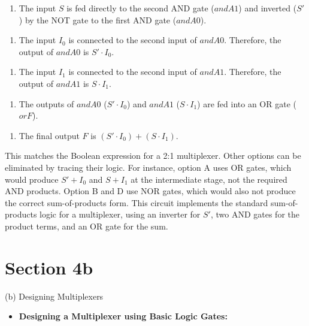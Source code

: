 \documentclass{article}
\begin{document}
\begin{itemize}
\begin{enumerate}
\item The input $S$ is fed directly to the second AND gate ($andA1$) and inverted ($S'$) by the NOT gate to the first AND gate ($andA0$).

\end{enumerate}
\begin{enumerate}
\item The input $I_0$ is connected to the second input of $andA0$. Therefore, the output of $andA0$ is $S' \cdot I_0$.

\end{enumerate}
\begin{enumerate}
\item The input $I_1$ is connected to the second input of $andA1$. Therefore, the output of $andA1$ is $S \cdot I_1$.

\end{enumerate}
\begin{enumerate}
\item The outputs of $andA0$ ($S' \cdot I_0$) and $andA1$ ($S \cdot I_1$) are fed into an OR gate ($orF$).

\end{enumerate}
\begin{enumerate}
\item The final output $F$ is $(S' \cdot I_0) + (S \cdot I_1)$.

\end{enumerate}
This matches the Boolean expression for a 2:1 multiplexer. Other options can be eliminated by tracing their logic. For instance, option A uses OR gates, which would produce $S' + I_0$ and $S + I_1$ at the intermediate stage, not the required AND products. Option B and D use NOR gates, which would also not produce the correct sum-of-products form. This circuit implements the standard sum-of-products logic for a multiplexer, using an inverter for $S'$, two AND gates for the product terms, and an OR gate for the sum.

\section{Section 4b}

(b) Designing Multiplexers

\begin{itemize}
    \item \textbf{Designing a Multiplexer using Basic Logic Gates:}
    

\end{itemize}
\end{itemize}
\end{document}
